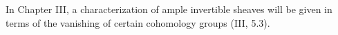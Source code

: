 In Chapter III, a characterization of ample invertible sheaves will be given in terms of the vanishing of certain cohomology groups (III, 5.3).
